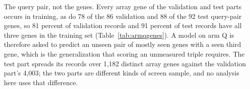 \begin{table}[htbp]
\centering
\footnotesize
\caption{The two arms. Both partition the same 376{,}732 records. Each part of arm
R carries every one of the 420 query pairs; the parts of arm Q carry disjoint sets
of them. The split artifacts are the files the trainer loads, under
\texttt{experiments/025-solid-growth/results/}.}
\label{tab:arms}

\end{table}

The query pair, not the genes. Every array gene of the validation and test parts
occurs in training, as do 78 of the 86 validation and 88 of the 92 test query-pair
genes, so 81 percent of validation records and 91 percent of test records have all
three genes in the training set (Table~\ref{tab:armqgenes}). A model on arm Q is
therefore asked to predict an unseen pair of mostly seen genes with a seen third
gene, which is the generalization that scoring an unmeasured triple requires. The
test part spreads its records over 1{,}182 distinct array genes against the
validation part's 4{,}003; the two parts are different kinds of screen sample, and
no analysis here uses that difference.

\begin{table}[htbp]
\centering
\footnotesize
\caption{What the held-out parts of arm Q share with its training part. A query pair
is the most frequent recurring pair a record carries, the rule that built the split;
the array gene is the record's third gene.}
\label{tab:armqgenes}

\end{table}
